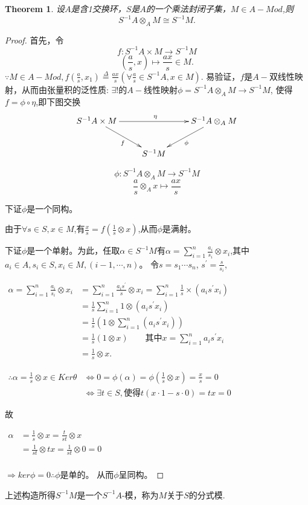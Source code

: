 \documentclass[UTF8]{article}
\newtheorem{thm}{Theorem}[section]
\begin{document}
\begin{thm}
 设$A$是含1交换环，$S$是$A$的一个乘法封闭子集，$M\in A-Mod$,则
	$$
	S^{-1}A\otimes_{A}M\cong S^{-1}M.
	$$	
\end{thm}
\begin{proof}
首先，令$$
	f:S^{-1}A\times M\rightarrow S^{-1}M$$
	$$
	\left(\frac{a}{s},x\right)\mapsto \frac{ax}{s}\in M. 
	$$
	$\because M\in A-Mod,f(\frac{a}{s},x_1)\stackrel{\Delta}{=}\frac{ax}{s}(\forall\frac{a}{s}\in S^{-1}A, x\in M).$
	易验证，$f$是$A-$双线性映射，从而由张量积的泛性质:
	$\exists!$的$A-$线性映射$\phi=S^{-1}A\otimes_AM\rightarrow S^{-1}M$,
	使得$f=\phi\circ\eta$,即下图交换
	$$
	\xymatrix{
		S^{-1}A\times M\ar[rr]^{\eta}\ar[rd]_{f}& &S^{-1}A\otimes_{A}M\ar[ld]^{\phi}\\
		&S^{-1}M&
	}
	$$
	
	$$
	\phi:S^{-1}A\otimes_AM\rightarrow S^{-1}M$$
	$$
	\frac{a}{s}\otimes_{A}x\mapsto\frac{ax}{s}
	$$	
	

\noindent 下证$\phi$是一个同构。


由于$\forall s\in S, x\in M$,有$\frac{x}{s}=f(\frac{1}{s}\otimes x)$,从而$\phi$是满射。


下证$\phi$是一个单射。为此，任取$\alpha\in S^{-1}M$有$\alpha=\sum_{i=1}^{n}\frac{a_i}{s_i}\otimes x_i$,其中$a_i\in A, s_i\in S, x_i\in M, (i-1,\cdots,n)$。
令$s=s_1\cdots s_n$, $s^\prime=\frac{s}{s_i}$,
\begin{center}
	$\begin{aligned}
	\alpha=\sum_{i=1}^{n}\frac{a_i}{s_i}\otimes x_i&=\sum_{i=1}^{n}\frac{a_is^\prime}{s}\otimes x_i=\sum_{i=1}^{n}\frac{1}{s}\times (a_is^\prime x_i)\\
	&=\frac{1}{s}\sum_{i=1}^{n}1\otimes(a_is^\prime x_i)\\
	&=\frac{1}{s}\left(1\otimes\sum_{i=1}^{n}(a_is^\prime x_i)\right)\\
	&=\frac{1}{s}(1\otimes x)\qquad\text{其中}x=\sum_{i=1}^{n}a_is^\prime x_i\\
	&=\frac{1}{s}\otimes x.
	\end{aligned}$
\end{center}

\begin{center}
	$\begin{aligned}
	\therefore\alpha=\frac{1}{s}\otimes x\in Ker\theta&\Leftrightarrow0=\phi(\alpha)=\phi(\frac{1}{s}\otimes x)=\frac{x}{s}=0\\
	&\Leftrightarrow \exists t\in S, \text{使得}t(x\cdot1-s\cdot0)=tx=0
	\end{aligned}$
\end{center}
故
\begin{center}
	$\begin{aligned}
	\alpha&=\frac{1}{s}\otimes x=\frac{t}{st}\otimes x\\
	&=\frac{1}{st}\otimes tx=\frac{1}{st}\otimes0=0\\
	\end{aligned}$
\end{center}
$\Rightarrow ker\phi=0$$\therefore \phi$是单的。
从而$\phi$呈同构。
\end{proof}
上述构造所得$S^{-1}M$是一个$S^{-1}A$-模，称为$M$关于$S$的分式模.\\
\end{document}
